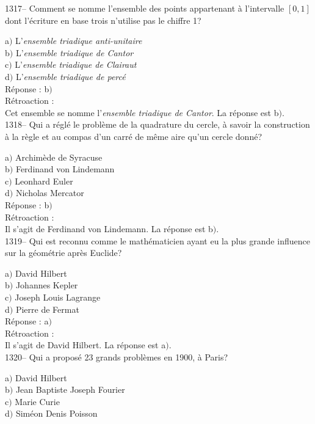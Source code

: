 ﻿\documentclass[letterpaper, 12pt]{article}
\begin{document}
1317-- Comment se nomme l'ensemble des points appartenant \`a
l'intervalle $[0,1]$ dont l'\'ecriture en base trois n'utilise pas
le chiffre 1?

a$)$ L'{\sl ensemble triadique anti-unitaire} \\
b$)$ L'{\sl ensemble triadique de Cantor} \\
c$)$ L'{\sl ensemble triadique de Clairaut} \\
d$)$ L'{\sl ensemble triadique de perc\'e}\\

R\'eponse : b$)$\\

R\'etroaction : \\
Cet ensemble se nomme l'{\sl ensemble triadique de Cantor}.
La r\'eponse est  b$)$.\\

1318-- Qui a r\'egl\'e le probl\`eme de la quadrature du cercle, \`a
savoir la construction \`a la r\`egle et au compas d'un carr\'e de
m\^eme aire qu'un cercle donn\'e?

a$)$ Archim\`ede de Syracuse \\
b$)$ Ferdinand von Lindemann \\
c$)$ Leonhard Euler \\
d$)$ Nicholas Mercator\\

R\'eponse : b$)$\\

R\'etroaction : \\
Il s'agit de Ferdinand von Lindemann.
La r\'eponse est  b$)$.\\

1319-- Qui est reconnu comme le math\'ematicien ayant eu la plus
grande influence sur la g\'eom\'etrie apr\`es Euclide?

a$)$ David Hilbert \\
b$)$ Johannes Kepler \\
c$)$ Joseph Louis Lagrange \\
d$)$ Pierre de Fermat\\

R\'eponse : a$)$\\

R\'etroaction : \\
Il s'agit de David Hilbert.
La r\'eponse est  a$)$.\\

1320-- Qui a propos\'e 23 grands probl\`emes en 1900, \`a Paris?

a$)$ David Hilbert \\
b$)$ Jean Baptiste Joseph Fourier \\
c$)$ Marie Curie \\
d$)$ Sim\'eon Denis Poisson\\
\end{document}

